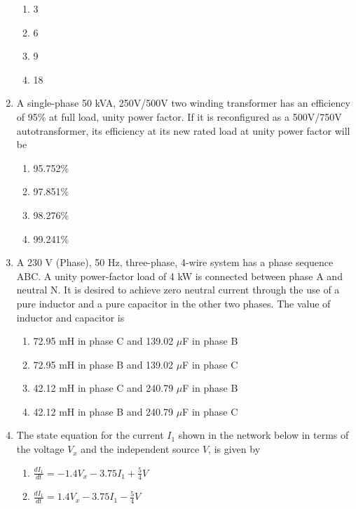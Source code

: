 \documentclass[journal]{IEEEtran}
\begin{document}
\begin{enumerate}
\begin{enumerate}
    \item 3\degree
    \item 6\degree
    \item 9\degree
    \item 18\degree \\
\end{enumerate}
\item A single-phase 50 kVA, 250V/500V two winding transformer has an efficiency of 95\% at full load, unity power factor. If it is reconfigured as a 500V/750V autotransformer, its efficiency at its new rated load at unity power factor will be
\begin{enumerate}
   \item 95.752\%
   \item 97.851\%
   \item 98.276\%
   \item 99.241\% \\
\end{enumerate}
\item A 230 V (Phase), 50 Hz, three-phase, 4-wire system has a phase sequence ABC. A unity power-factor load of 4 kW is connected between phase A and neutral N. It is desired to achieve zero neutral current through the use of a pure inductor and a pure capacitor in the other two phases. The value of inductor and capacitor is
\begin{enumerate}
    \item 72.95 mH in phase C and 139.02 $\mu$F in phase B
    \item 72.95 mH in phase B and 139.02 $\mu$F in phase C
    \item 42.12 mH in phase C and 240.79 $\mu$F in phase B
    \item 42.12 mH in phase B and 240.79 $\mu$F in phase C \\
\end{enumerate}
\item The state equation for the current $I_1$ shown in the network below in terms of the voltage $V_x$ and the independent source $V$, is given by
\begin{figure}[!ht]
\centering
\resizebox{0.5\textwidth}{!}{%

}%
\end{figure}
\begin{enumerate}
    \item $\frac{dI_1}{dt} = -1.4V_x - 3.75I_1 + \frac{5}{4}V$
    \item $\frac{dI_1}{dt} = 1.4V_x - 3.75I_1 - \frac{5}{4}V$

\end{enumerate}
\end{enumerate}
\end{document}
